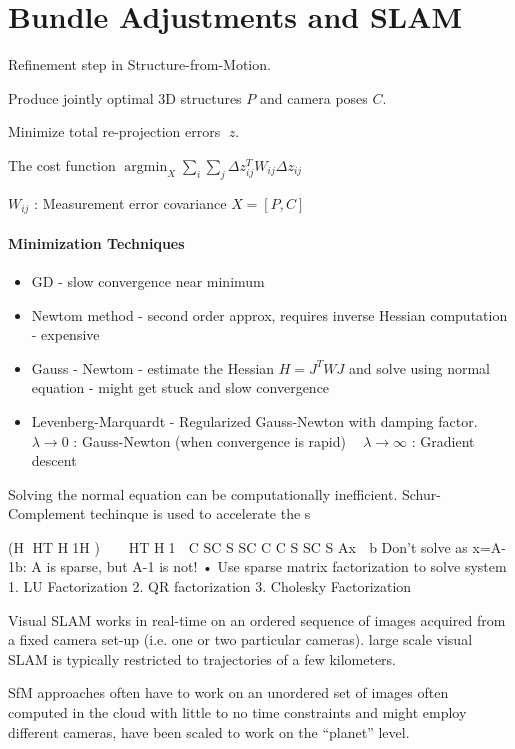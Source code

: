 \section{Bundle Adjustments and SLAM}

Refinement step in Structure-from-Motion.

Produce jointly optimal 3D structures $P$ and camera poses $C$.

Minimize total re-projection errors 􏰅$z$.

The cost function $\operatorname{argmin}_X \sum_i \sum_j \Delta z_{ij}^T W_{ij} \Delta z_{ij} $

$W_{ij}$ : Measurement error covariance
$X = [P,C]$


\paragraph{Minimization Techniques}

\begin{itemize}
\item GD - slow convergence near minimum
\item Newtom method - second order approx, requires inverse Hessian computation - expensive
\item Gauss - Newtom - estimate the Hessian $H = J^TWJ$ and solve using normal equation - might get stuck and slow convergence 
\item Levenberg-Marquardt - Regularized Gauss-Newton with damping factor. 
􏰍 􏰎$ \lambda \to 0$ : Gauss-Newton (when convergence is rapid)
􏰍 􏰎$ \lambda \to \infty$ : Gradient descent
\end{itemize}

Solving the normal equation can be computationally inefficient. Schur-Complement techinque is used to accelerate the s

(H 􏰃HT H􏰃1H )􏰌 􏰆􏰐 􏰃􏰐HT H􏰃1 􏰑 C SC S SC C C S SC S
Ax 􏰆 b Don’t solve as x=A-1b: A is sparse, but A-1 is not!
• Use sparse matrix factorization to solve system
 1. LU Factorization
2. QR factorization
3. Cholesky Factorization

Visual SLAM works in real-time on an ordered sequence of images acquired from a fixed camera set-up (i.e. one or two particular cameras). 
large scale visual SLAM is typically restricted to trajectories of a few kilometers.

SfM approaches often have to work on an unordered set of images often computed in the cloud with little to no time constraints and might employ different cameras, have been scaled to work on the “planet” level. 

